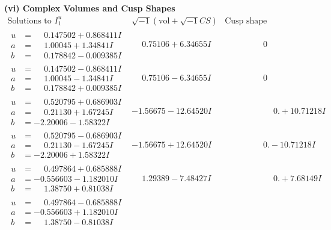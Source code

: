 \documentclass[1p]{elsarticle_modified}
\theoremstyle{definition}
\newcommand{\I}{\sqrt{-1}}
\begin{document}
\newpage\flushleft \textbf{(vi) Complex Volumes and Cusp Shapes}
$$\begin{array}{c|c|c}  
\text{Solutions to }I^u_{1}& \I (\text{vol} + \sqrt{-1}CS) & \text{Cusp shape}\\
 \hline 
\begin{aligned}
u &= \phantom{-}0.147502 + 0.868411 I \\
a &= \phantom{-}1.00045 + 1.34841 I \\
b &= \phantom{-}0.178842 - 0.009385 I\end{aligned}
 & \phantom{-}0.75106 + 6.34655 I & \phantom{-0.000000 } 0 \\ \hline\begin{aligned}
u &= \phantom{-}0.147502 - 0.868411 I \\
a &= \phantom{-}1.00045 - 1.34841 I \\
b &= \phantom{-}0.178842 + 0.009385 I\end{aligned}
 & \phantom{-}0.75106 - 6.34655 I & \phantom{-0.000000 } 0 \\ \hline\begin{aligned}
u &= \phantom{-}0.520795 + 0.686903 I \\
a &= \phantom{-}0.21130 + 1.67245 I \\
b &= -2.20006 - 1.58322 I\end{aligned}
 & -1.56675 - 12.64520 I & \phantom{-0.000000 -}0. + 10.71218 I \\ \hline\begin{aligned}
u &= \phantom{-}0.520795 - 0.686903 I \\
a &= \phantom{-}0.21130 - 1.67245 I \\
b &= -2.20006 + 1.58322 I\end{aligned}
 & -1.56675 + 12.64520 I & \phantom{-0.000000 } 0. - 10.71218 I \\ \hline\begin{aligned}
u &= \phantom{-}0.497864 + 0.685888 I \\
a &= -0.556603 - 1.182010 I \\
b &= \phantom{-}1.38750 + 0.81038 I\end{aligned}
 & \phantom{-}1.29389 - 7.48427 I & \phantom{-0.000000 -}0. + 7.68149 I \\ \hline\begin{aligned}
u &= \phantom{-}0.497864 - 0.685888 I \\
a &= -0.556603 + 1.182010 I \\
b &= \phantom{-}1.38750 - 0.81038 I\end{aligned}

\end{array}$$
\end{document}
